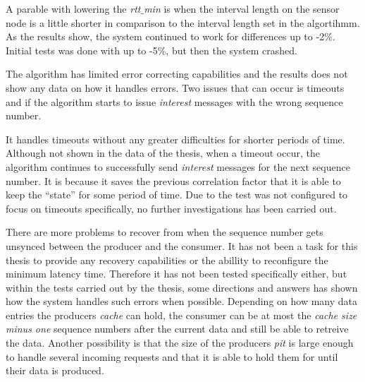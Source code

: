 A parable with lowering the \textit{rtt$\_$min} is when the interval length on the sensor node is a little shorter in comparison to the interval length set in the algortihmm. 
As the results show, the system continued to work for differences up to -2$\%$. Initial tests was done with up to -5$\%$, but then the system crashed.

The algorithm has limited error correcting capabilities and the results does not show any data on how it handles errors. Two issues that can occur is timeouts and if the algorithm starts to issue \textit{interest} messages with the wrong sequence number. 

It handles timeouts without any greater difficulties for shorter periods of time. Although not shown in the data of the thesis, when a timeout occur, the algorithm continues to successfully send \textit{interest} messages for the next sequence number. It is because it saves the previous correlation factor that it is able to keep the ``state'' for some period of time. Due to the test was not configured to focus on timeouts specifically, no further investigations has been carried out.

There are more problems to recover from when the sequence number gets unsynced between the producer and the consumer. 
It has not been a task for this thesis to provide any recovery capabilities or the abillity to reconfigure the minimum latency time. Therefore it has not been tested specifically either, but within the tests carried out by the thesis, some directions and answers has shown how the system handles such errors when possible.
Depending on how many data entries the producers \textit{cache} can hold, the consumer can be at most the \textit{cache size minus one} sequence numbers after the current data and still be able to retreive the data. 
Another possibility is that the size of the producers \textit{pit} is large enough to handle several incoming requests and that it is able to hold them for until their data is produced. 




%


